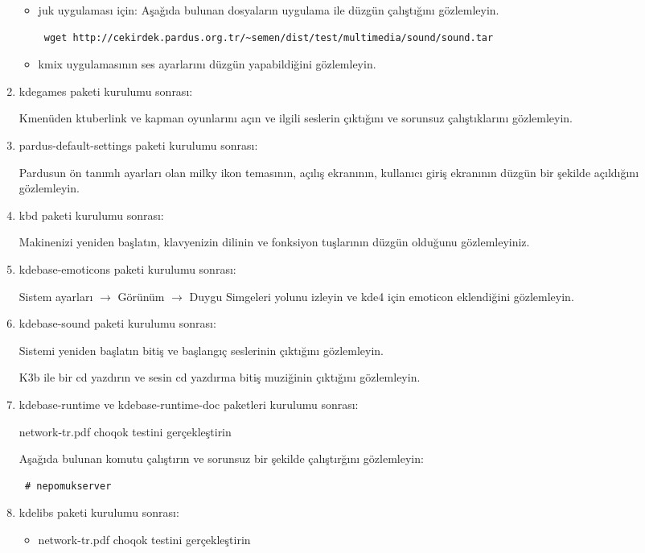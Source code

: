 \documentclass[a4paper,10pt]{article}
\begin{document}
\begin{enumerate}
\begin{itemize}
\item juk uygulaması için:
Aşağıda bulunan dosyaların uygulama ile düzgün çalıştığını gözlemleyin.
\begin{verbatim}
 wget http://cekirdek.pardus.org.tr/~semen/dist/test/multimedia/sound/sound.tar
\end{verbatim}

\item kmix uygulamasının ses ayarlarını düzgün yapabildiğini gözlemleyin.

\end{itemize}


\item kdegames paketi kurulumu sonrası:

Kmenüden ktuberlink ve kapman oyunlarını açın ve ilgili seslerin çıktığını ve sorunsuz çalıştıklarını gözlemleyin.

\item pardus-default-settings paketi kurulumu sonrası:

Pardusun ön tanımlı ayarları olan milky ikon temasının, açılış ekranının, kullanıcı giriş ekranının düzgün bir şekilde açıldığını gözlemleyin.

\item kbd paketi kurulumu sonrası:

Makinenizi yeniden başlatın, klavyenizin dilinin ve fonksiyon tuşlarının düzgün olduğunu gözlemleyiniz. 
\item kdebase-emoticons paketi kurulumu sonrası:

Sistem ayarları $\rightarrow$ Görünüm $\rightarrow$ Duygu Simgeleri yolunu izleyin ve kde4 için emoticon eklendiğini gözlemleyin.

\item kdebase-sound paketi kurulumu sonrası:

Sistemi yeniden başlatın bitiş ve başlangıç seslerinin çıktığını gözlemleyin.

K3b ile bir cd yazdırın ve sesin cd yazdırma bitiş muziğinin çıktığını gözlemleyin.
\item kdebase-runtime ve kdebase-runtime-doc paketleri kurulumu sonrası:

network-tr.pdf choqok testini gerçekleştirin

Aşağıda bulunan komutu çalıştırın ve sorunsuz bir şekilde çalıştırğını gözlemleyin:
\begin{verbatim}
 # nepomukserver
\end{verbatim}

 \item kdelibs paketi kurulumu sonrası:
\begin{itemize}
 \item network-tr.pdf choqok testini gerçekleştirin



\end{itemize}
\end{enumerate}
\end{document}

